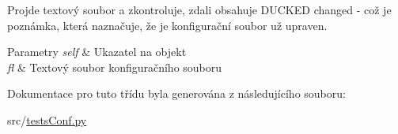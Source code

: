 Projde textový soubor a zkontroluje, zdali obsahuje D\-U\-C\-K\-E\-D changed -\/ což je poznámka, která naznačuje, že je konfigurační soubor už upraven. 


\begin{DoxyParams}{Parametry}
{\em self} & Ukazatel na objekt \\
\hline
{\em fl} & Textový soubor konfiguračního souboru \\
\hline
\end{DoxyParams}


Dokumentace pro tuto třídu byla generována z následujícího souboru\-:\begin{DoxyCompactItemize}
\item 
src/\hyperlink{testsConf_8py}{tests\-Conf.\-py}\end{DoxyCompactItemize}

